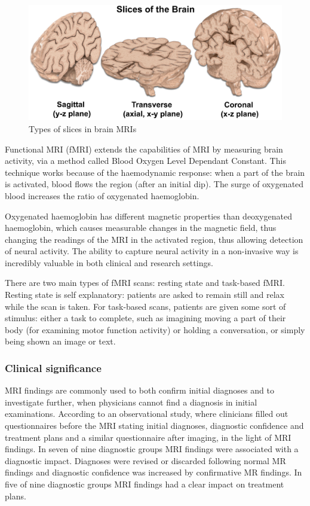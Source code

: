 	\begin{figure}[!h]
		\centering
		\includegraphics[width=\textwidth]{figures/slice_types.png}
		\caption{Types of slices in brain MRIs\cite{mripage}}
	\end{figure}
	
	Functional MRI (fMRI) extends the capabilities of MRI by measuring brain activity, via a method called Blood Oxygen Level Dependant Constant\cite{glover2011overview}. This technique works because of the haemodynamic response: when a part of the brain is activated, blood flows the region (after an initial dip). The surge of oxygenated blood increases the ratio of oxygenated haemoglobin.
	
	Oxygenated haemoglobin has different magnetic properties than deoxygenated haemoglobin, which causes measurable changes in the magnetic field, thus changing the readings of the MRI in the activated region, thus allowing detection of neural activity. The ability to capture neural activity in a non-invasive way is incredibly valuable in both clinical and research settings.
	
	There are two main types of fMRI scans: resting state and task-based fMRI. Resting state is self explanatory: patients are asked to remain still and relax while the scan is taken. For task-based scans, patients are given some sort of stimulus: either a task to complete, such as imagining moving a part of their body (for examining motor function activity) or holding a conversation, or simply being shown an image or text. 
	
		\subsubsection{Clinical significance}
		
		MRI findings are commonly used to both confirm initial diagnoses and to investigate further, when physicians cannot find a diagnosis in initial examinations.  According to an observational study\cite{hollingworth2000diagnostic}, where clinicians filled out questionnaires before the MRI stating initial diagnoses, diagnostic confidence and treatment plans and a similar questionnaire after imaging, in the light of MRI findings. In seven of nine diagnostic groups MRI findings were associated with a diagnostic impact. Diagnoses were revised or discarded following normal MR findings and diagnostic confidence was increased by confirmative MR findings. In five of nine diagnostic groups MRI findings had a clear impact on treatment plans. 

